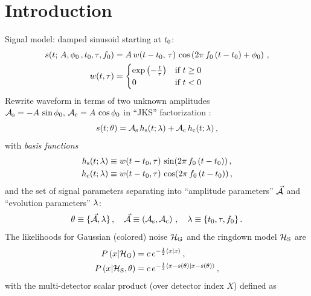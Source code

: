 \documentclass[aps,prd,onecolumn,notitlepage,nofootinbib,superscriptaddress,altaffilletter,floatfix]{revtex4-1}
\begin{document}
\newpage
\section{Introduction}
\label{Intro}

Signal model: damped sinusoid starting at $t_0$:
\begin{align}
  \label{eq:1}
  s(t;\,A, \phi_0\,, t_0, \tau, f_0) &= A\,w(t-t_0,\,\tau)\,\cos\left(2\pi\,f_0\,(t-t_0) + \phi_0\right)\,,\\
  w(t, \tau) &=
  \begin{cases}
    \exp\left( -\frac{t}{\tau} \right) & \text{if } t \ge 0\,\\
    0  & \text{if } t < 0
  \end{cases}
\end{align}
Rewrite waveform in terms of two unknown amplitudes $\mathcal{A}_{\mathrm{s}} = -A\,\sin\phi_0,\,\mathcal{A}_{\mathrm{c}} = A\,\cos\phi_0$ in ``JKS'' factorization
\cite{bretthorst1988:_bayesian_spectrum,jks98:_data}:
\begin{equation}
  \label{eq:2}
  s(t; \theta) = \mathcal{A}_{\mathrm{s}} \, h_\mathrm{s}(t;\lambda) + \mathcal{A}_{\mathrm{c}}\,h_\mathrm{c}(t;\lambda)\,,
\end{equation}
with \emph{basis functions}
\begin{align}
  \label{eq:14}
  h_\mathrm{s}(t;\lambda) &\equiv w(t-t_0,\tau)\,\sin(2\pi \,f_0\,(t-t_0))\,,\\
  h_\mathrm{c}(t;\lambda) &\equiv w(t-t_0,\tau)\,\cos(2\pi \,f_0\,(t-t_0))\,,
\end{align}
and the set of signal parameters separating into ``amplitude parameters'' $\vec{\mathcal{A}}$ and ``evolution parameters'' $\lambda$:
\begin{equation}
  \label{eq:11}
  \theta \equiv \{\vec{\mathcal{A}}, \lambda\}\,,
  \quad \vec{\mathcal{A}} \equiv \left(\mathcal{A}_{\mathrm{s}},\mathcal{A}_{\mathrm{c}}\right)\,,
  \quad \lambda \equiv \{t_0,\tau, f_0\}\,.
\end{equation}
The likelihoods for Gaussian (colored) noise $\mathcal{H}_{\mathrm{G}}$ and the ringdown model $\mathcal{H}_{\mathrm{S}}$ are
\begin{align}
  \label{eq:4}
  P\left(x|\mathcal{H}_{\mathrm{G}}\right) &= c\,e^{-\frac{1}{2}\langle x|x\rangle}\,,\\
  P\left(x|\mathcal{H}_{\mathrm{S}},\theta\right) &= c\,e^{-\frac{1}{2}\langle x-s(\theta)|x-s(\theta)\rangle}\,,
\end{align}
with the multi-detector scalar product (over detector index $X$) defined as
\end{document}
